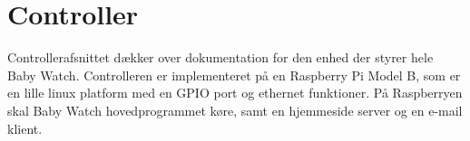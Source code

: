 \chapter{Controller}

Controllerafsnittet dækker over dokumentation for den enhed der styrer hele Baby Watch. Controlleren er implementeret på en Raspberry Pi Model B, som er en lille linux platform med en GPIO port og ethernet funktioner. På Raspberryen skal Baby Watch hovedprogrammet køre, samt en hjemmeside server og en e-mail klient.





